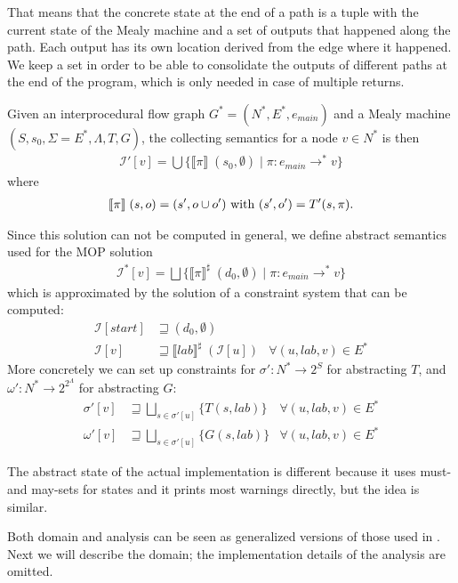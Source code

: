 That means that the concrete state at the end of a path is a tuple with the current state of the Mealy machine and a set of outputs that happened along the path. Each output has its own location derived from the edge where it happened. We keep a set in order to be able to consolidate the outputs of different paths at the end of the program, which is only needed in case of multiple returns.

Given an interprocedural flow graph $G^* = (N^*,E^*,e_{main})$ and a Mealy machine $(S, s_0, \Sigma=E^*, \Lambda, T, G)$, the collecting semantics for a node $v \in N^*$ is then
\begin{align}
\mathcal{I}'[v] = \bigcup \{\llbracket \pi \rrbracket \; (s_0, \emptyset) \; | \; \pi : e_{main} \to^* v\}
\end{align}
where
\begin{align}
\llbracket \pi \rrbracket \; (s,o) = (s', o \cup o') \text{ with } (s', o') = T'(s, \pi).
\end{align}

Since this solution can not be computed in general, we define abstract semantics used for the MOP solution
\begin{align}
\mathcal{I}^*[v] = \bigsqcup \{\llbracket \pi \rrbracket^\sharp \; (d_0, \emptyset) \; | \; \pi : e_{main} \to^* v\}
\end{align}
which is approximated by the solution of a constraint system that can be computed:
\begin{align}
\mathcal{I}[start] &\sqsupseteq (d_0, \emptyset)\\
\mathcal{I}[v]	   &\sqsupseteq \llbracket lab \rrbracket^\sharp \; (\mathcal{I}[u])	&\forall (u, lab, v) \in E^*
\end{align}
More concretely we can set up constraints for $\sigma' : N^* \to 2^S$ for abstracting $T$, and $\omega' : N^* \to 2^{2^\Lambda}$ for abstracting $G$:
\begin{align}
\sigma'[v] &\sqsupseteq \bigsqcup_{s\in\sigma'[u]} \{T(s,lab)\}	&\forall (u,lab,v)\in E^*\\
\omega'[v] &\sqsupseteq \bigsqcup_{s\in\sigma'[u]} \{G(s,lab)\}	&\forall (u,lab,v)\in E^*
\end{align}

The abstract state of the actual implementation is different because it uses must- and may-sets for states and it prints most warnings directly, but the idea is similar.

Both domain and analysis can be seen as generalized versions of those used in . Next we will describe the domain; the implementation details of the analysis are omitted.


